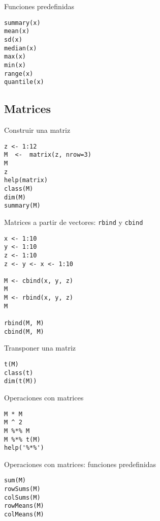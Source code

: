 \documentclass[xcolor={usenames,svgnames,dvipsnames}]{beamer}
\begin{document}
\begin{frame}[fragile,label=sec-2-1-15]{Funciones predefinidas}
 \lstset{language=R,numbers=none}
\begin{lstlisting}
summary(x)
mean(x)
sd(x)
median(x)
max(x)
min(x)
range(x)
quantile(x)
\end{lstlisting}
\end{frame}


\subsection{Matrices}
\label{sec-2-2}
\begin{frame}[fragile,label=sec-2-2-1]{Construir una matriz}
 \lstset{language=R,numbers=none}
\begin{lstlisting}
z <- 1:12
M  <-  matrix(z, nrow=3)
M
z
help(matrix)
class(M)
dim(M)
summary(M)
\end{lstlisting}
\end{frame}
\begin{frame}[fragile,label=sec-2-2-2]{Matrices a partir de vectores: \texttt{rbind} y \texttt{cbind}}
 \lstset{language=R,numbers=none}
\begin{lstlisting}
x <- 1:10
y <- 1:10
z <- 1:10
z <- y <- x <- 1:10

M <- cbind(x, y, z)
M
M <- rbind(x, y, z)
M

rbind(M, M)
cbind(M, M)
\end{lstlisting}
\end{frame}
\begin{frame}[fragile,label=sec-2-2-3]{Transponer una matriz}
 \lstset{language=R,numbers=none}
\begin{lstlisting}
t(M)
class(t)
dim(t(M))
\end{lstlisting}
\end{frame}
\begin{frame}[fragile,label=sec-2-2-4]{Operaciones con matrices}
 \lstset{language=R,numbers=none}
\begin{lstlisting}
M * M
M ^ 2
M %*% M
M %*% t(M)
help('%*%')
\end{lstlisting}
\end{frame}
\begin{frame}[fragile,label=sec-2-2-5]{Operaciones con matrices: funciones predefinidas}
 \lstset{language=R,numbers=none}
\begin{lstlisting}
sum(M)
rowSums(M)
colSums(M)
rowMeans(M)
colMeans(M)
\end{lstlisting}
\end{frame}
\end{document}
